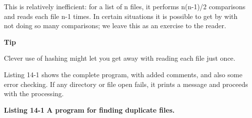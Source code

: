 This is relatively inefficient: for a list of n files, it performs
n(n-1)/2 comparisons and reads each file n-1 times. In certain
situations it is possible to get by with not doing so many comparisons;
we leave this as an exercise to the reader.

{\sffamily\bfseries
Tip}

{\sffamily
Clever use of hashing might let you get away with reading each
file just once.}

Listing 14-1 shows the complete program, with added comments, and also
some error checking. If any directory or file open fails, it prints a
message and proceeds with the processing.

\bigskip

{\sffamily\bfseries Listing 14-1}
{\sffamily\bfseries A program for finding duplicate files.}

